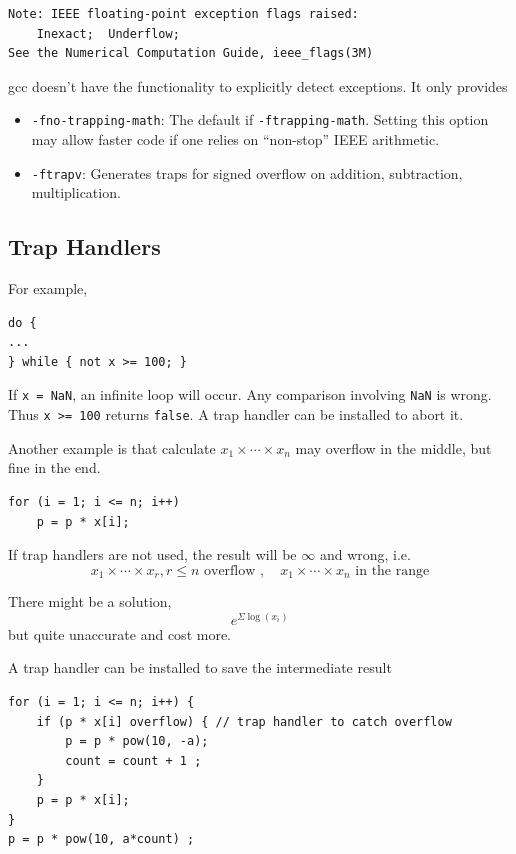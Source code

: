\begin{verbatim}
Note: IEEE floating-point exception flags raised:
    Inexact;  Underflow; 
See the Numerical Computation Guide, ieee_flags(3M)
\end{verbatim}

\begin{note}
    gcc doesn't have the functionality to explicitly detect exceptions. It only provides 
    \begin{itemize}
        \item \texttt{-fno-trapping-math}: The default if \texttt{-ftrapping-math}. Setting this option may allow faster code if one relies on “non-stop” IEEE arithmetic.
        \item \texttt{-ftrapv}: Generates traps for signed overflow on addition, subtraction, multiplication.
    \end{itemize}
\end{note}

\subsection{Trap Handlers}

For example,

\begin{verbatim}
do {
...
} while { not x >= 100; }
\end{verbatim}

If \texttt{x = NaN}, an infinite loop will occur. Any comparison involving \texttt{NaN} is wrong. Thus \texttt{x >=
100} returns \texttt{false}. A trap handler can be installed to abort it.

\newpage

Another example is that calculate $x_1 \times \cdots \times x_n$ may overflow in the middle, but fine in the end.

\begin{verbatim}
for (i = 1; i <= n; i++)
    p = p * x[i];
\end{verbatim}

If trap handlers are not used, the result will be $\infty$ and wrong, i.e. \[
    x_1 \times \cdots \times x_r, r \leq n \text{ overflow }, \quad x_1 \times \cdots \times x_n \text{ in the range} 
\]

\begin{note}
    There might be a solution, 
    \[
        e^{\Sigma \log (x_i)}
    \]
    but quite unaccurate and cost more.
\end{note}
\vspace{0.5em}

A trap handler can be installed to save the intermediate result

\begin{verbatim}
for (i = 1; i <= n; i++) {
    if (p * x[i] overflow) { // trap handler to catch overflow
        p = p * pow(10, -a);
        count = count + 1 ;
    }
    p = p * x[i];
}
p = p * pow(10, a*count) ;
\end{verbatim}